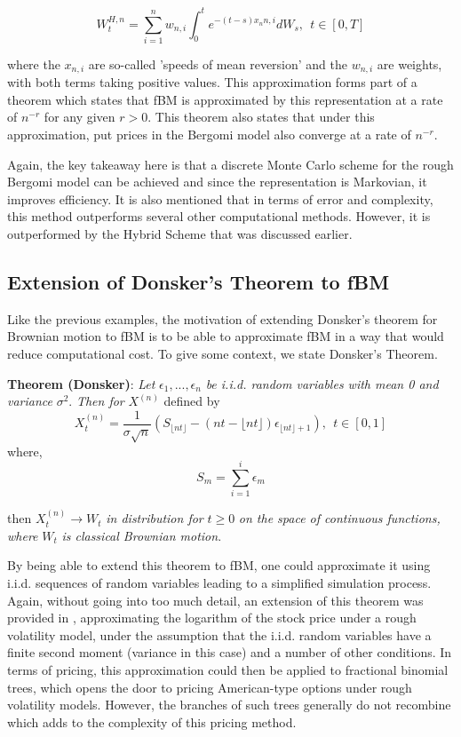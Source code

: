 \documentclass[12pt,oneside]{article}
\begin{document}
\begin{equation}
\label{eqn:markov_approx}
W_t^{H,n} = \sum_{i=1}^n w_{n,i} \int_0^t e^{-(t-s)x_{n}n,i}dW_s, \ \ t \in [0,T] 
\end{equation}

where the $x_{n,i}$ are so-called 'speeds of mean reversion' and the $w_{n,i}$ are weights, with both terms taking positive values. This approximation forms part of a theorem which states that fBM is approximated by this representation at a rate of $n^{-r}$ for any given $r>0$. This theorem also states that under this approximation, put prices in the Bergomi model also converge at a rate of $n^{-r}$. 

Again, the key takeaway here is that a discrete Monte Carlo scheme for the rough Bergomi model can be achieved and since the representation is Markovian, it improves efficiency. It is also mentioned that in terms of error and complexity, this method outperforms several other computational methods. However, it is outperformed by the Hybrid Scheme that was discussed earlier. 

\subsection{Extension of Donsker's Theorem to fBM}
Like the previous examples, the motivation of extending Donsker's theorem for Brownian motion to fBM is to be able to approximate fBM in a way that would reduce computational cost. To give some context,  we state Donsker's Theorem.

 \noindent\textbf{Theorem (Donsker)}: \emph{Let} $\epsilon_1,...,\epsilon_n$ \emph{be i.i.d. random variables with mean 0 and variance} $\sigma^2$. \emph{Then for} $X^{(n)}$ defined by
 \begin{equation}
 \label{eq:donsker_thm}
 X_t^{(n)} = \frac{1}{\sigma \sqrt{n}} (S_{\lfloor nt \rfloor} - (nt - \lfloor nt \rfloor) \epsilon_{\lfloor nt \rfloor + 1}), \ \ t\in[0,1]
 \end{equation}
 where,
\begin{equation}
S_m = \sum_{i=1}^i \epsilon_m
\end{equation}

then $X_t^{(n)} \rightarrow W_t$ \emph{in distribution for} $t\ge0$ \emph{on the space of continuous functions, where} $W_t$ \emph{is classical Brownian motion}.

By being able to extend this theorem to fBM, one could approximate it using i.i.d. sequences of random variables leading to a simplified simulation process. Again, without going into too much detail, an extension of this theorem was provided in \cite{horvath2019functional}, approximating the logarithm of the stock price under a rough volatility model, under the assumption that the i.i.d. random variables have a finite second moment (variance in this case) and a number of other conditions. In terms of pricing, this approximation could then be applied to fractional binomial trees, which opens the door to pricing American-type options under rough volatility models. However, the branches of such trees generally do not recombine which adds to the complexity of this pricing method.   
\end{document}
